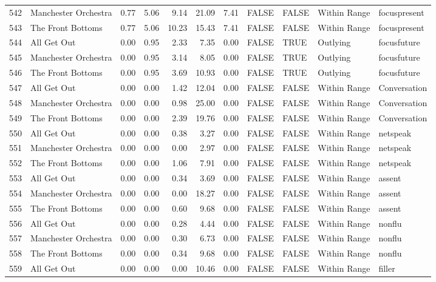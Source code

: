 \begin{table}[ht]
\begin{tabular}{rlrrrrrllll}
  542 & Manchester Orchestra & 0.77 & 5.06 & 9.14 & 21.09 & 7.41 & FALSE & FALSE & Within Range & focuspresent \\ 
  543 & The Front Bottoms & 0.77 & 5.06 & 10.23 & 15.43 & 7.41 & FALSE & FALSE & Within Range & focuspresent \\ 
  544 & All Get Out & 0.00 & 0.95 & 2.33 & 7.35 & 0.00 & FALSE & TRUE & Outlying & focusfuture \\ 
  545 & Manchester Orchestra & 0.00 & 0.95 & 3.14 & 8.05 & 0.00 & FALSE & TRUE & Outlying & focusfuture \\ 
  546 & The Front Bottoms & 0.00 & 0.95 & 3.69 & 10.93 & 0.00 & FALSE & TRUE & Outlying & focusfuture \\ 
  547 & All Get Out & 0.00 & 0.00 & 1.42 & 12.04 & 0.00 & FALSE & FALSE & Within Range & Conversation \\ 
  548 & Manchester Orchestra & 0.00 & 0.00 & 0.98 & 25.00 & 0.00 & FALSE & FALSE & Within Range & Conversation \\ 
  549 & The Front Bottoms & 0.00 & 0.00 & 2.39 & 19.76 & 0.00 & FALSE & FALSE & Within Range & Conversation \\ 
  550 & All Get Out & 0.00 & 0.00 & 0.38 & 3.27 & 0.00 & FALSE & FALSE & Within Range & netspeak \\ 
  551 & Manchester Orchestra & 0.00 & 0.00 & 0.00 & 2.97 & 0.00 & FALSE & FALSE & Within Range & netspeak \\ 
  552 & The Front Bottoms & 0.00 & 0.00 & 1.06 & 7.91 & 0.00 & FALSE & FALSE & Within Range & netspeak \\ 
  553 & All Get Out & 0.00 & 0.00 & 0.34 & 3.69 & 0.00 & FALSE & FALSE & Within Range & assent \\ 
  554 & Manchester Orchestra & 0.00 & 0.00 & 0.00 & 18.27 & 0.00 & FALSE & FALSE & Within Range & assent \\ 
  555 & The Front Bottoms & 0.00 & 0.00 & 0.60 & 9.68 & 0.00 & FALSE & FALSE & Within Range & assent \\ 
  556 & All Get Out & 0.00 & 0.00 & 0.28 & 4.44 & 0.00 & FALSE & FALSE & Within Range & nonflu \\ 
  557 & Manchester Orchestra & 0.00 & 0.00 & 0.30 & 6.73 & 0.00 & FALSE & FALSE & Within Range & nonflu \\ 
  558 & The Front Bottoms & 0.00 & 0.00 & 0.34 & 9.68 & 0.00 & FALSE & FALSE & Within Range & nonflu \\ 
  559 & All Get Out & 0.00 & 0.00 & 0.00 & 10.46 & 0.00 & FALSE & FALSE & Within Range & filler \\ 

\end{tabular}
\end{table}
